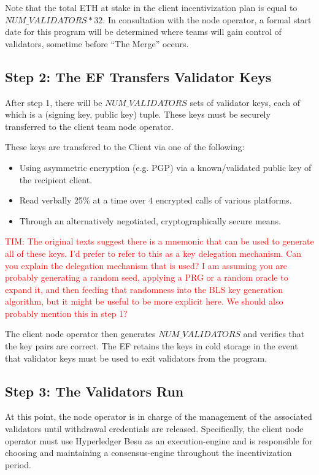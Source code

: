 Note that the total ETH at stake in the client incentivization plan is equal to $NUM\_VALIDATORS * 32$. In consultation with the node operator, a formal start date for this program will be determined where teams will gain control of validators, sometime before ``The Merge'' occurs.

\subsection{Step 2:  The EF Transfers Validator Keys}
After step 1, there will be $NUM\_VALIDATORS$ sets of validator keys, each of which is a (signing key, public key) tuple. These keys must be securely transferred to the client team node operator.

These keys are transfered to the Client via one of the following:
\begin{itemize}
\item Using asymmetric encryption (e.g. PGP) via a known/validated public key of the recipient client.
\item Read verbally 25\% at a time over $4$ encrypted calls of various platforms.
\item Through an alternatively negotiated, cryptographically secure means.
\end{itemize}

\textcolor{red}{TIM:  The original texts suggest there is a mnemonic that can be used to generate all of these keys.  I'd prefer to refer to this as a key delegation mechanism.  Can you explain the delegation mechanism that is used?  I am assuming you are probably generating a random seed, applying a PRG or a random oracle to expand it, and then feeding that randomness into the BLS key generation algorithm, but it might be useful to be more explicit here.  We should also probably mention this in step 1?}

The client node operator then generates $NUM\_VALIDATORS$ and verifies that the key pairs are correct. The EF retains the keys in cold storage in the event that validator keys must be used to exit validators from the program.


\subsection{Step 3:  The Validators Run}
At this point, the node operator is in charge of the management of the associated validators until withdrawal credentials are released. Specifically, the client node operator must use Hyperledger Besu as an execution-engine and is responsible for choosing and maintaining a consensus-engine throughout the incentivization period.

